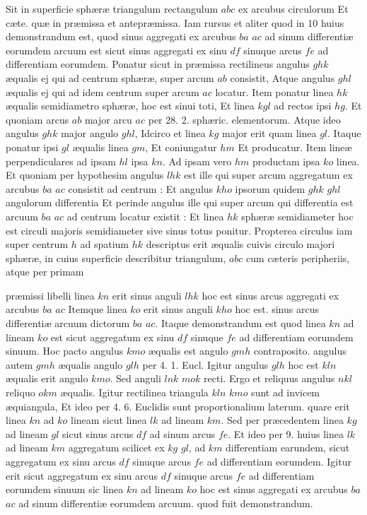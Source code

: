 \documentclass[11pt,a4paper]{article}
\begin{document}
Sit in superficie sphæræ triangulum rectangulum $abc$ ex arcubus circulorum Et cæte. quæ in præmissa et antepræmissa. Iam rursus et aliter quod in 10 huius demonstrandum est, quod sinus aggregati ex arcubus $ba$ $ac$ ad  sinum differentiæ eorumdem arcuum est sicut sinus aggregati ex sinu $df$ sinuque arcus $fe$ ad differentiam eorumdem. Ponatur sicut in præmissa rectilineus angulus $ghk$ æqualis ej qui ad centrum sphæræ, super arcum $ab$ consistit, Atque angulus $ghl$ æqualis ej qui ad idem centrum super arcum $ac$ locatur. Item ponatur linea $hk$ æqualis semidiametro sphæræ, hoc est sinui toti, Et linea $kgl$ ad rectos ipsi $hg$. Et quoniam arcus $ab$ major arcu $ac$ per 28. 2. sphæric. elementorum. Atque ideo angulus $ghk$ major angulo $ghl$, Idcirco et linea $kg$ major erit quam linea $gl$. Itaque ponatur ipsi $gl$ æqualis linea $gm$, Et coniungatur $hm$ Et producatur. Item lineæ perpendiculares ad ipsam $hl$ ipsa $kn$. Ad ipsam vero $hm$ productam ipsa $ko$ linea. Et quoniam per hypothesim angulus $lhk$ est ille qui super arcum aggregatum ex arcubus $ba$ $ac$ consistit ad centrum : Et angulus $kho$ ipsorum quidem $ghk$ $ghl$ angulorum differentia Et perinde angulus ille qui super arcum qui differentia est arcuum $ba$ $ac$ ad centrum locatur existit : Et linea $hk$ sphæræ semidiameter hoc est circuli majoris semidiameter sive sinus totus ponitur. Propterea circulus iam super centrum $h$ ad spatium $hk$ descriptus erit æqualis cuivis circulo majori sphæræ, in cuius superficie describitur triangulum, $abc$ cum cæteris peripheriis, atque per primam

præmissi libelli linea $kn$ erit sinus anguli $lhk$ hoc est sinus arcus aggregati ex arcubus $ba$ $ac$ Itemque linea $ko$ erit sinus anguli $kho$ hoc est. sinus arcus differentiæ arcuum dictorum $ba$ $ac$. Itaque demonstrandum est quod linea $kn$ ad lineam $ko$ est sicut aggregatum ex sinu $df$ sinuque $fe$ ad differentiam eorumdem sinuum. Hoc pacto angulus $kmo$ æqualis est angulo $gmh$ contraposito. angulus autem $gmh$ æqualis angulo $glh$ per 4. 1. Eucl. Igitur angulus $glh$ hoc est $kln$ æqualis erit angulo $kmo$. Sed anguli $lnk$ $mok$ recti. Ergo et reliquus angulus $nkl$ reliquo $okm$ æqualis. Igitur rectilinea triangula $kln$ $kmo$ sunt ad invicem æquiangula, Et ideo per 4. 6. Euclidis sunt proportionalium laterum. quare erit  linea $kn$ ad $ko$ lineam sicut linea $lk$ ad lineam $km$. Sed per præcedentem linea $kg$ ad lineam $gl$ sicut sinus arcus $df$ ad sinum arcus $fe$. Et ideo per 9. huius linea $lk$ ad lineam $km$ aggregatum scilicet ex $kg$ $gl$, ad $km$ differentiam earundem, sicut aggregatum ex sinu arcus $df$ sinuque arcus $fe$ ad differentiam eorumdem. Igitur erit sicut aggregatum ex sinu arcus $df$ sinuque arcus $fe$ ad differentiam eorumdem sinuum sic linea $kn$ ad lineam $ko$ hoc est sinus aggregati ex arcubus $ba$ $ac$ ad sinum differentiæ eorumdem arcuum. quod fuit demonstrandum.
\end{document}
